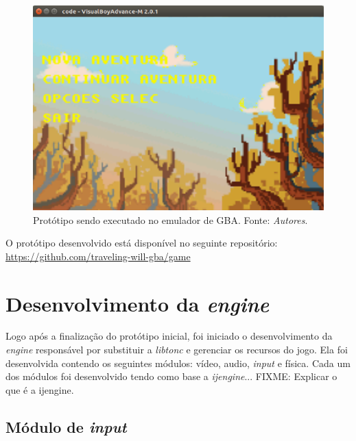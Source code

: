 \begin{figure}[H]
 \centering \includegraphics[keepaspectratio=true,scale=0.6]{figuras/tw-gba-1.eps}
   \caption[Protótipo sendo executado no emulador de GBA]
    {Protótipo sendo executado no emulador de GBA. Fonte: \textit{Autores}.}
   \label{tw-gba-1}
\end{figure}

O protótipo desenvolvido está disponível no seguinte repositório: \url{https://github.com/traveling-will-gba/game}

\section{Desenvolvimento da \textit{engine}}

Logo após a finalização do protótipo inicial, foi iniciado o desenvolvimento da \textit{engine} responsável por substituir a \textit{libtonc} e gerenciar os recursos do jogo. Ela foi desenvolvida contendo os seguintes módulos: vídeo, audio, \textit{input} e física. Cada um dos módulos foi desenvolvido tendo como base a \textit{ijengine}... FIXME: Explicar o que é a ijengine.

\subsection{Módulo de \textit{input}}

